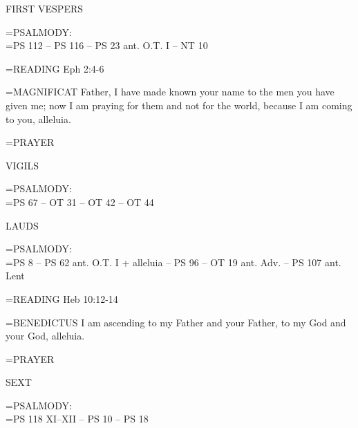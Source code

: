 \begin{flushleft}\normalsize FIRST VESPERS\\\end{flushleft}

\hangindent=\parindent \small{PSALMODY:}\\
\hangindent=\parindent  PS 112 -- PS 116 -- PS 23 ant. O.T. I -- NT 10\vspace{0.5em}

\hangindent=\parindent \small{READING}    Eph 2:4-6 \textbf{   \\}

\hangindent=\parindent \small{MAGNIFICAT 	Father, I have made known your name to the men you have given me; now I am praying for them and not for the world, because I am coming to you, alleluia.\\}

\hangindent=\parindent \small{PRAYER 	}

\begin{flushleft}\normalsize VIGILS\\\end{flushleft}

\hangindent=\parindent \small{PSALMODY:}\\
\hangindent=\parindent  PS 67 -- OT 31 -- OT 42 -- OT 44\vspace{0.5em}

\begin{flushleft}\normalsize LAUDS\\\end{flushleft}

\hangindent=\parindent \small{PSALMODY:}\\
\hangindent=\parindent  PS 8 -- PS 62 ant. O.T. I + alleluia -- PS 96 -- OT 19 ant. Adv. -- PS 107 ant. Lent\vspace{0.5em}

\hangindent=\parindent \small{READING}    Heb 10:12-14 \textbf{   \\}

\hangindent=\parindent \small{BENEDICTUS 	I am ascending to my Father and your Father, to my God and your God, alleluia.\\}

\hangindent=\parindent \small{PRAYER 	}

\begin{flushleft}\normalsize SEXT\\\end{flushleft}

\hangindent=\parindent \small{PSALMODY:}\\
\hangindent=\parindent  PS 118 XI--XII -- PS 10 -- PS 18\vspace{0.5em}

